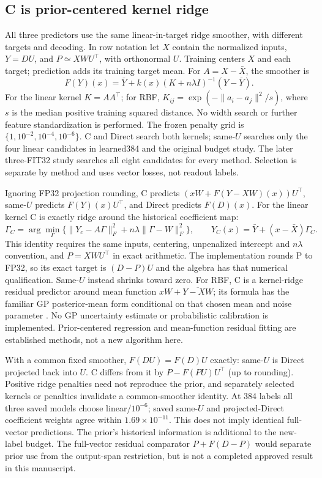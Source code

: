 \subsection{C is prior-centered kernel ridge}\label{sec:priorridge}
All three predictors use the same linear-in-target ridge smoother, with different targets and decoding. In row notation let $X$ contain the normalized inputs, $Y=DU$, and $P\simeq XWU^\top$, with orthonormal $U$. Training centers $X$ and each target; prediction adds its training target mean. For $A=X-\bar X$, the smoother is
\[
 F(Y)(x)=\bar Y+k(x)(K+n\lambda I)^{-1}(Y-\bar Y).
\]
For the linear kernel $K=AA^\top$; for RBF, $K_{ij}=\exp(-\|a_i-a_j\|^2/s)$, where $s$ is the median positive training squared distance. No width search or further feature standardization is performed. The frozen penalty grid is $\{1,10^{-2},10^{-4},10^{-6}\}$. C and Direct search both kernels; same-$U$ searches only the four linear candidates in learned384 and the original budget study. The later three-FIT32 study searches all eight candidates for every method. Selection is separate by method and uses vector losses, not readout labels.

Ignoring FP32 projection rounding, C predicts $(xW+F(Y-XW)(x))U^\top$, same-$U$ predicts $F(Y)(x)U^\top$, and Direct predicts $F(D)(x)$. For the linear kernel C is exactly ridge around the historical coefficient map:
\[
 \Gamma_C=\arg\min_\Gamma\{\|Y_c-A\Gamma\|_F^2+n\lambda\|\Gamma-W\|_F^2\},
 \qquad \widehat Y_C(x)=\bar Y+(x-\bar X)\Gamma_C.
\]
This identity requires the same inputs, centering, unpenalized intercept and $n\lambda$ convention, and $P=XWU^\top$ in exact arithmetic. The implementation rounds P to FP32, so its exact target is $(D-P)U$ and the algebra has that numerical qualification. Same-$U$ instead shrinks toward zero. For RBF, C is a kernel-ridge residual predictor around mean function $xW+\overline{Y-XW}$; its formula has the familiar GP posterior-mean form conditional on that chosen mean and noise parameter \cite{rasmussen2006}. No GP uncertainty estimate or probabilistic calibration is implemented. Prior-centered regression and mean-function residual fitting are established methods, not a new algorithm here.

With a common fixed smoother, $F(DU)=F(D)U$ exactly: same-$U$ is Direct projected back into $U$. C differs from it by $P-F(PU)U^\top$ (up to rounding). Positive ridge penalties need not reproduce the prior, and separately selected kernels or penalties invalidate a common-smoother identity. At 384 labels all three saved models choose linear/$10^{-6}$; saved same-$U$ and projected-Direct coefficient weights agree within $1.69\times10^{-11}$. This does not imply identical full-vector predictions. The prior's historical information is additional to the new-label budget. The full-vector residual comparator $P+F(D-P)$ would separate prior use from the output-span restriction, but is not a completed approved result in this manuscript.
